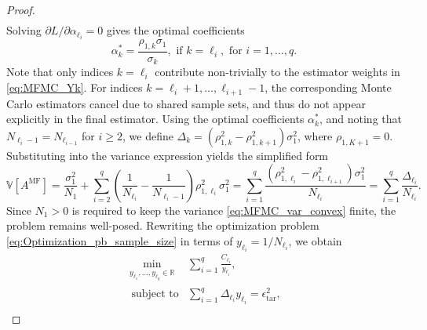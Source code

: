 \begin{proof}
\begin{align}
\end{align}
%
Solving $\partial L/\partial \alpha_{\ell_i} = 0$ gives the optimal coefficients
%
\[
\alpha_{k}^* = \frac{\rho_{1,k}\sigma_1}{\sigma_{k}}, \text{ if } k=\ell_i, \text{ for }i= 1,\ldots,q.
\]
%
Note that only indices $k=\ell_i$ contribute non-trivially to the estimator weights in \eqref{eq:MFMC_Yk}. For indices $k = \ell_i+1,\ldots, \ell_{i+1}-1$, the corresponding Monte Carlo estimators cancel due to shared sample sets, and thus do not appear explicitly in the final estimator. Using the optimal coefficients $\alpha_k^*$, and noting that $N_{\ell_{i}-1} = N_{\ell_{i-1}}$ for $i \ge 2$, we define $\Delta_k = (\rho_{1,k}^2 - \rho_{1,k+1}^2)\sigma_1^2$, where $\rho_{1,K+1} = 0$. Substituting into the variance expression yields the simplified form
%
\begin{equation}\label{eq:MFMC_var_convex}
    \mathbb{V}\left[A^{\text{MF}}\right] = \frac{\sigma_1^2}{N_1}+\sum_{i=2}^q
\left(\frac{1}{N_{\ell_{i}}}-\frac{1}{N_{\ell_{i}-1}}\right)\rho_{1,\ell_i}^2\sigma_1^2=\sum_{i=1}^{q} \frac{ \left(\rho_{1,\ell_i}^2-\rho_{1,\ell_{i+1}}^2\right)\sigma_1^2}{N_{\ell_i}}=\sum_{i=1}^{q} \frac{\Delta_{\ell_i}}{N_{\ell_i}}.
\end{equation}
%
Since $N_1 > 0$ is required to keep the variance \eqref{eq:MFMC_var_convex} finite, the problem remains well-posed. Rewriting the optimization problem \eqref{eq:Optimization_pb_sample_size}  in terms of $y_{\ell_i} = 1/N_{\ell_i}$, we obtain
%
\begin{equation*}\label{eq:Optimization_pb_sample_size3}
    \begin{array}{ll}
    \min \limits_{\begin{array}{c}\scriptstyle y_{\ell_1},\ldots, y_{\ell_q}\in \mathbb{R}
\end{array}} &\displaystyle \sum_{i=1}^q \frac{C_{\ell_i}}{y_{\ell_i}},\\
       \;\,\text{subject to} &\displaystyle \sum_{i=1}^q \Delta_{\ell_i} y_{\ell_i}= \epsilon_{\text{tar}}^2,\\[2pt]

\end{array}
\end{equation*}
\end{proof}
